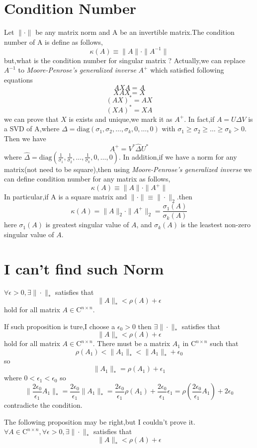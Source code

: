 \documentclass[a4paper,12pt]{article}
\begin{document}
\section{Condition Number}

Let $\|\cdot\|$ be any matrix norm and A be an invertible matrix.The condition number of A is define as follows,
\[ \kappa(A) \equiv \|A\| \cdot \|A^{-1}\| \]
but,what is the condition number for singular matrix ?
Actually,we can replace $A^{-1}$ to \textit{Moore-Penrose's generalized inverse} $A^{+}$ which satisfied following equations
\[ AXA = A \]
\[ XAX = X \]
\[ (AX)^* = AX \]
\[ (XA)^* = XA \]
we can prove that $X$ is exists and unique,we mark it as $A^{+}$.\newline
In fact,if $A=U \Delta V$ is a SVD of A,where $\Delta = \mbox{diag}(\sigma_1,\sigma_2,\ldots,\sigma_k,0,\ldots,0)$ with $\sigma_1 \geq \sigma_2 \geq \ldots \geq \sigma_k >0 $.\newline 
Then we  have 
\[ A^{+}=V^* \hat{\Delta} U^* \]
where $\hat{\Delta} = \mbox{diag}(\frac{1}{\sigma_1},\frac{1}{\sigma_2},\ldots,\frac{1}{\sigma_k},0,\ldots,0)$.
In addition,if we have a norm for any matrix(not need to be square),then using \textit{Moore-Penrose's generalized inverse} we can define condition number for any matrix as follows,
\[ \kappa(A) \equiv \|A\| \cdot \|A^{+}\| \]
In particular,if A is a square matrix and $\|\cdot\| \equiv \|\cdot\|_2 $.then  
\[ \kappa(A) = \|A\|_2 \cdot \|A^{+}\|_2 = \frac{\sigma_1(A)}{\sigma_k(A)} \]
here $\sigma_1(A)$ is greatest singular value of $A$, and $\sigma_k(A)$ is the leastest non-zero singular value of $A$.


\section{I can't find such Norm}
$\forall \epsilon>0,\exists \|\cdot\|_*$ satisfies that
\[ \|A\|_* < \rho(A) + \epsilon \]
hold for all matrix $A \in \mathrm{C}^{n \times n}$.

If such proposition is ture,I choose a $\epsilon_0>0$ then $\exists \|\cdot\|_*$ satisfies that
\[ \|A\|_* < \rho(A) + \epsilon \]
hold for all matrix $A \in \mathrm{C}^{n \times n}$.\newline
There must be a matrix $A_1$ in $\mathrm{C}^{n \times n}$ such that 
\[ \rho(A_1) < \|A_1\|_* < \|A_1\|_* + \epsilon_0 \]
so 
\[ \|A_1\|_* = \rho(A_1) + \epsilon_1 \]
where $0<\epsilon_1<\epsilon_0$
so 
\[ \|\frac{2\epsilon_0}{\epsilon_1}A_1\|_* = \frac{2\epsilon_0}{\epsilon_1}\|A_1\|_* = \frac{2\epsilon_0}{\epsilon_1}\rho(A_1) +\frac{2\epsilon_0}{\epsilon_1}\epsilon_1 = \rho(\frac{2\epsilon_0}{\epsilon_1}A_1) + 2\epsilon_0 \]
contradicte the condition.

The following proposition may be right,but I couldn't prove it.
$\forall A \in \mathrm{C}^{n \times n}, \forall \epsilon>0,\exists \|\cdot\|_*$ satisfies that
\[ \|A\|_* < \rho(A) + \epsilon \]
\end{document}
